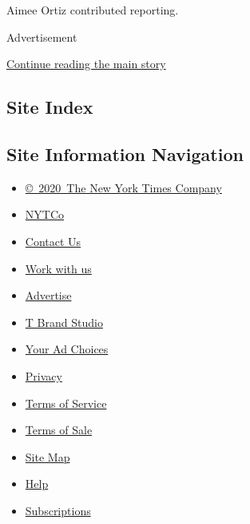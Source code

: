 Aimee Ortiz contributed reporting.

Advertisement

\protect\hyperlink{after-bottom}{Continue reading the main story}

\hypertarget{site-index}{%
\subsection{Site Index}\label{site-index}}

\hypertarget{site-information-navigation}{%
\subsection{Site Information
Navigation}\label{site-information-navigation}}

\begin{itemize}
\tightlist
\item
  \href{https://help.nytimes.com/hc/en-us/articles/115014792127-Copyright-notice}{©~2020~The
  New York Times Company}
\end{itemize}

\begin{itemize}
\tightlist
\item
  \href{https://www.nytco.com/}{NYTCo}
\item
  \href{https://help.nytimes.com/hc/en-us/articles/115015385887-Contact-Us}{Contact
  Us}
\item
  \href{https://www.nytco.com/careers/}{Work with us}
\item
  \href{https://nytmediakit.com/}{Advertise}
\item
  \href{http://www.tbrandstudio.com/}{T Brand Studio}
\item
  \href{https://www.nytimes.com/privacy/cookie-policy\#how-do-i-manage-trackers}{Your
  Ad Choices}
\item
  \href{https://www.nytimes.com/privacy}{Privacy}
\item
  \href{https://help.nytimes.com/hc/en-us/articles/115014893428-Terms-of-service}{Terms
  of Service}
\item
  \href{https://help.nytimes.com/hc/en-us/articles/115014893968-Terms-of-sale}{Terms
  of Sale}
\item
  \href{https://spiderbites.nytimes.com}{Site Map}
\item
  \href{https://help.nytimes.com/hc/en-us}{Help}
\item
  \href{https://www.nytimes.com/subscription?campaignId=37WXW}{Subscriptions}
\end{itemize}
